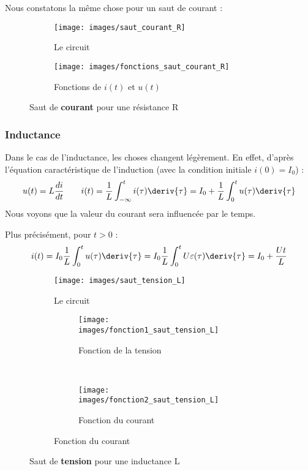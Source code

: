 \documentclass[12pt,a4paper]{article}
\begin{document}
Nous constatons la même chose pour un saut de courant :
\begin{figure}[!h]
	\centering
	\begin{subfigure}[c]{0.45\textwidth}
		\centering
		\texttt{[image: images/saut\_courant\_R]}
		\caption{Le circuit}
	\end{subfigure}
	\begin{subfigure}[c]{0.45\textwidth}
		\centering
		\texttt{[image: images/fonctions\_saut\_courant\_R]}
		\caption{Fonctions de $i(t)$ et $u(t)$}
	\end{subfigure}
	\caption{Saut de \textbf{courant} pour une résistance R}
\end{figure}

\subsubsection{Inductance}
Dans le cas de l'inductance, les choses changent légèrement. En effet, d'après l'équation caractéristique de l'induction (avec la condition initiale $i(0) = I_0$) :
\begin{equation}
	u(t) = L\frac{di}{dt} \qquad i(t) = \frac{1}{L}\int_{-\infty}^t i(\tau)\deriv{\tau} = I_0 + \frac{1}{L}\int_0^t u(\tau)\deriv{\tau}
	\label{equ: saut inductance}
\end{equation}
Nous voyons que la valeur du courant sera influencée par le temps.

 Plus précisément, pour $t > 0$ :
\[i(t) = I_0 \frac{1}{L}\int_0^t u(\tau)\deriv{\tau} = I_0 \frac{1}{L}\int_0^t U\varepsilon(\tau)\deriv{\tau} = I_0 + \frac{Ut}{L}\]
\begin{figure}[!h]
	\centering
	\begin{subfigure}[c]{0.45\textwidth}
		\centering
		\texttt{[image: images/saut\_tension\_L]}
		\caption{Le circuit}
	\end{subfigure}
	\begin{subfigure}[c]{0.45\textwidth}
		\centering
		\begin{subfigure}{0.9\textwidth}
			\centering
			\texttt{[image: images/fonction1\_saut\_tension\_L]}
			\caption{Fonction de la tension}
		\end{subfigure}\\
		\begin{subfigure}[c]{0.9\textwidth}
			\centering
			\texttt{[image: images/fonction2\_saut\_tension\_L]}
			\caption{Fonction du courant}
		\end{subfigure}	
	\end{subfigure}
	\caption{Saut de \textbf{tension} pour une inductance L}
\end{figure}
\end{document}
